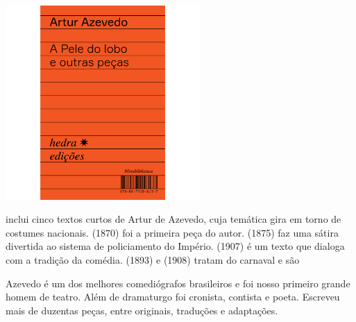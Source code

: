 \begin{center}
\hspace*{-3.6cm}
\hspace*{3.1cm}\includegraphics[width=74mm]{./grid/azevedo.jpg}
\end{center}

\hspace*{-7cm}\hrulefill\hspace*{-7cm}

\medskip

 inclui cinco textos curtos de Artur de Azevedo, cuja temática gira em torno de costumes nacionais. {} (1870) foi a primeira peça do autor. {} (1875) faz uma sátira divertida ao sistema de policiamento do Império. {} (1907) é um texto que dialoga com a tradição da comédia. {} (1893) e {} (1908) tratam do carnaval e são 

Azevedo é um dos melhores comediógrafos brasileiros e foi nosso primeiro grande homem de teatro. Além de dramaturgo foi cronista, contista e poeta. Escreveu mais de duzentas peças, entre originais, traduções e adaptações.


\vfill

\hspace*{-.4cm}\begin{minipage}[c]{.5\linewidth}
\small{
{}}
\end{minipage}

